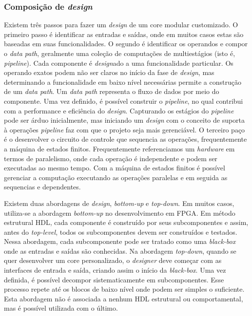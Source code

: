 \subsubsection{Composição de \textit{design}}

Existem três passos para fazer um \textit{design} de um core modular customizado. O primeiro passo é identificar as entradas e saídas, onde em muitos casos estas são baseadas em suas funcionalidades. O segundo é identificar os operandos e compor o \textit{data path}, geralmente uma coleção de computações de multiestágios (isto é, \textit{pipeline}). Cada componente é \textit{design}ado a uma funcionalidade particular. Os operando exatos podem não ser claros no início da fase de \textit{design}, mas determinando a funcionalidade em baixo nível necessárias permite a construção de um \textit{data path}. Um \textit{data path} representa o fluxo de dados por meio do componente. Uma vez definido, é possível construir o \textit{pipeline}, no qual contribui com a performance e eficiência do \textit{design}. Capturando os estágios do \textit{pipeline} pode ser árduo inicialmente, mas iniciando um \textit{design} com o conceito de suporta à operações \textit{pipeline} faz com que o projeto seja mais gerenciável. O terceiro paço é o desenvolver o circuito de controle que sequencia as operações, frequentemente a máquina de estados finitos. Frequentemente referenciamos um \textit{hardware} em termos de paralelismo, onde cada operação é independente e podem ser executadas ao mesmo tempo. Com a máquina de estados finitos é possível gerenciar a computação executando as operações paralelas e em seguida as sequencias e dependentes.

Existem duas abordagens de \textit{design}, \textit{bottom-up} e \textit{top-down}. Em muitos casos, utiliza-se a abordagem \textit{bottom-up} no desenvolvimento em FPGA. Em método estrutural HDL, cada componente é construído por seus subcomponentes e assim, antes do \textit{top-level}, todos os subcomponentes devem ser construídos e testados. Nessa abordagem, cada subcomponente pode ser tratado como uma \textit{black-box} onde as entradas e saídas são conhecidas. Na abordagem \textit{top-down}, quando se quer desenvolver um core personalizado, o \textit{\textit{design}er} deve começar com as interfaces de entrada e saída, criando assim o início da \textit{black-box}. Uma vez definida, é possível decompor sistematicamente em subcomponentes. Esse processo repete até os blocos de baixo nível onde podem ser simples o suficiente. Esta abordagem não é associada a nenhum HDL estrutural ou comportamental, mas é possível utilizada com o último.

